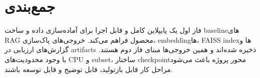 \documentclass[12pt,a4paper]{article}
\begin{document}
\section{جمع‌بندی}

فاز اول یک پایپلاین کامل و قابل اجرا برای آماده‌سازی داده و ساخت baselineهای RAG محصول فراهم می‌کند. خروجی‌های پاک‌سازی، embeddingها، FAISS indexها و گزارش‌های ارزیابی در artifacts ذخیره شده‌اند و همین خروجی‌ها مبنای فاز دوم هستند. با وجود محدودیت‌های CPU و subset، ساختار checkpointمحور پروژه باعث می‌شود مراحل کار قابل بازتولید، قابل توضیح و قابل توسعه باشند.
\end{document}
